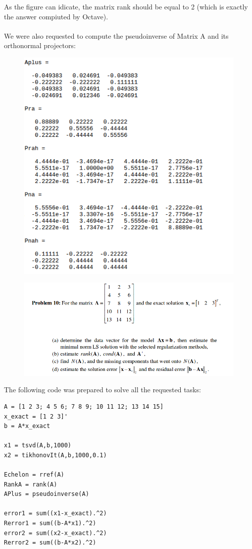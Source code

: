 \documentclass[eng,openany]{mgr}
\begin{document}
As the figure can idicate, the matrix rank should be equal to 2 (which is exactly the answer compiuted by Octave).
\\
\\
We were also requested to compute the pseudoinverse of Matrix A and its orthonormal projectors:
\begin{figure}[h]
\centering
\includegraphics[width=0.7\linewidth]{screenshot028}
\label{fig:screenshot028}
\end{figure}
\newpage
\begin{figure}[h]
\centering
\includegraphics[width=0.7\linewidth]{screenshot029}
\label{fig:screenshot029}
\end{figure}
The following code was prepared to solve all the requested tasks:
\begin{lstlisting}
A = [1 2 3; 4 5 6; 7 8 9; 10 11 12; 13 14 15]
x_exact = [1 2 3]'
b = A*x_exact

x1 = tsvd(A,b,1000)
x2 = tikhonovIt(A,b,1000,0.1)

Echelon = rref(A)
RankA = rank(A)
APlus = pseudoinverse(A)

error1 = sum((x1-x_exact).^2)
Rerror1 = sum((b-A*x1).^2)
error2 = sum((x2-x_exact).^2)
Rerror2 = sum((b-A*x2).^2)
\end{lstlisting}
\end{document}

